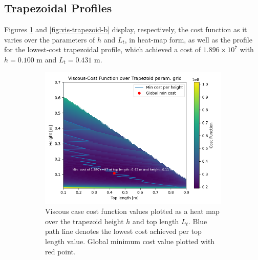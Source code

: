 \documentclass[11pt]{article}
\begin{document}
\subsection{Trapezoidal Profiles}
Figures \ref{fig:vis-trapezoid-a} and \ref{fig:vis-trapezoid-b} display, respectively, the cost function as it varies over the parameters of $h$ and $L_t$, in heat-map form, as well as the profile for the lowest-cost trapezoidal profile, which achieved a cost of $1.896\times 10^7$ with $h=0.100 \text{ m}$ and $L_t=0.431 \text{ m}$.
\begin{figure}[H]
\centering
\begin{subfigure}[b]{0.54\textwidth}
    \centering
    \includegraphics[width=\linewidth]{../results/viscous/trapezoids.png}
    \caption{Viscous case cost function values plotted as a heat map over the trapezoid height $h$ and top length $L_t$. Blue path line denotes the lowest cost achieved per top length value. Global minimum cost value plotted with red point.}
    \label{fig:vis-trapezoid-a}
\end{subfigure}
\hfill
\begin{subfigure}[b]{0.44\textwidth}
    \centering

\end{subfigure}
\end{figure}
\end{document}
